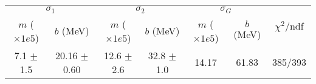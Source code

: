 \begin{tabular}{cc|cc|cc||c}
\multicolumn{2}{c|}{$\sigma_1$} & \multicolumn{2}{|c}{$\sigma_2$} & \multicolumn{2}{|c}{$\sigma_G$}  & \multirow{2}{*}{$\chi^2/$ndf}\\
$m$ ($\times1e5$) & $b$ (MeV) & $m$ ($\times1e5$) & $b$ (MeV) & $m$ ($\times1e5$) & $b$ (MeV) & \\
\hline
7.1 $\pm$ 1.5 & 20.16 $\pm$ 0.60 & 12.6 $\pm$ 2.6 & 32.8 $\pm$ 1.0 & 14.17 & 61.83 & 385/393\\
\end{tabular}
